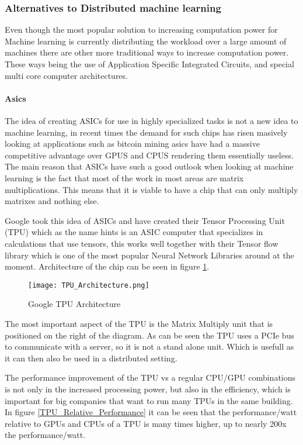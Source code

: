 
\subsubsection{Alternatives to Distributed machine learning}
Even though the most popular solution to increasing computation power for Machine
learning is currently distributing the workload over a large amount of machines
there are other more traditional ways to increase computation power. These ways
being the use of Application Specific Integrated Circuits, and special multi core
computer architectures.

\paragraph{Asics}
The idea of creating ASICs for use in highly specialized tasks is not a new idea
to machine learning, in recent times the demand for such chips has risen masively\cite{Metz18}
looking at applications such as bitcoin mining asics have had a massive competitive
advantage over GPUS and CPUS rendering them essentially useless. The main reason
that ASICs have such a good outlook when looking at machine
learning is the fact that most of the work in most areas are matrix multiplications.
This means that it is viable to have a chip that can only multiply matrixes and nothing
else.

Google took this idea of ASICs and have created their Tensor Processing Unit (TPU)\cite{Sato17}
which as the name hints is an ASIC computer that specializes in calculations that
use tensors, this works well together with their Tensor flow library which is one
of the most popular Neural Network Libraries around at the moment. Architecture of
the chip can be seen in figure \ref{TPU_Architecture}.

\begin{figure}
  \texttt{[image: TPU\_Architecture.png]}
  \caption{Google TPU Architecture\cite{Joup17}}
  \label{TPU_Architecture}
\end{figure}

The most important aspect of the TPU is the Matrix Multiply unit that is positioned
on the right of the diagram. As can be seen the TPU uses a PCIe bus to communicate
with a server, so it is not a stand alone unit. Which is usefull as it can then also
be used in a distributed setting.

The performance improvement of the TPU vs a regular CPU/GPU combinations is not only
in the increased processing power, but also in the efficiency, which is important
for big companies that want to run many TPUs in the same building. In figure \ref{TPU_Relative_Performance}
it can be seen that the performance/watt relative to GPUs and CPUs of a TPU is many times higher,
up to nearly 200x the performance/watt.

